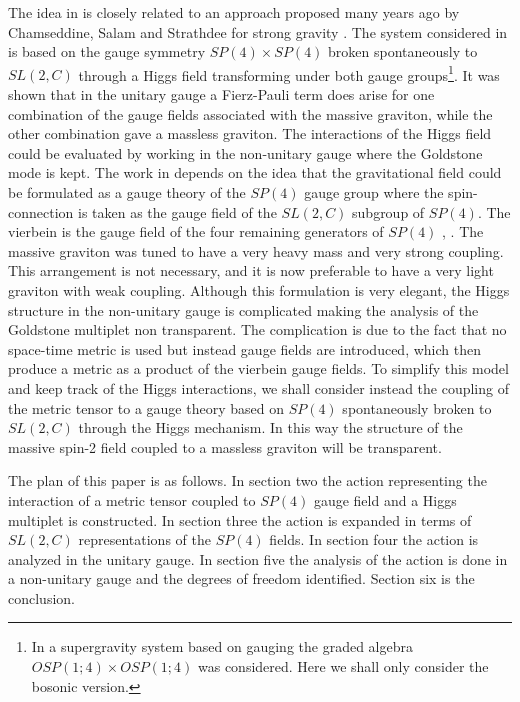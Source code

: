 \documentclass[a4paper,12pt]{article}
\begin{document}
The idea in \cite{ags} is closely related to an approach proposed many years
ago by Chamseddine, Salam and Strathdee \cite{css} for strong gravity
\cite{iss}. The system considered in \cite{css} is based on the gauge symmetry
$SP(4)\times SP(4)$ broken spontaneously to $SL(2,C)$ through a Higgs field
transforming under both gauge groups\footnote[1]{In \cite{css} a supergravity
system based on gauging the graded algebra $OSP(1;4)\times OSP(1;4)$ was
considered. Here we shall only consider the bosonic version.}. It was shown
that in the unitary gauge a Fierz-Pauli term does arise for one combination of
the gauge fields associated with the massive graviton, while the other
combination gave a massless graviton. The interactions of the Higgs field
could be evaluated by working in the non-unitary gauge where the Goldstone
mode is kept. The work in \cite{css} depends on the idea that the
gravitational field could be formulated as a gauge theory of the $SP(4)$ gauge
group where the spin-connection is taken as the gauge field of the $SL(2,C)$
subgroup of $SP(4).$ The vierbein is the gauge field of the four remaining
generators of $SP(4)$ \cite{cho}, \cite{ch}. The massive graviton was tuned to
have a very heavy mass and very strong coupling. This arrangement is not
necessary, and it is now preferable to have a very light graviton with weak
coupling. Although this formulation is very elegant, the Higgs structure in
the non-unitary gauge is complicated making the analysis of the Goldstone
multiplet non transparent. The complication is due to the fact that no
space-time metric is used but instead gauge fields are introduced, which then
produce a metric as a product of the vierbein gauge fields. To simplify this
model and keep track of the Higgs interactions, we shall consider instead the
coupling of the metric tensor to a gauge theory based on $SP(4)$ spontaneously
broken to $SL(2,C)$ through the Higgs mechanism. In this way the structure of
the massive spin-2 field coupled to a massless graviton will be transparent.

The plan of this paper is as follows. In section two the action representing
the interaction of a metric tensor coupled to $SP(4)$ gauge field and a Higgs
multiplet is constructed. In section three the action is expanded in terms of
$SL(2,C)$ representations of the $SP(4)$ fields. In section four the action is
analyzed in the unitary gauge. In section five the analysis of the action is
done in a non-unitary gauge and the degrees of freedom identified. Section six
is the conclusion.
\end{document}
